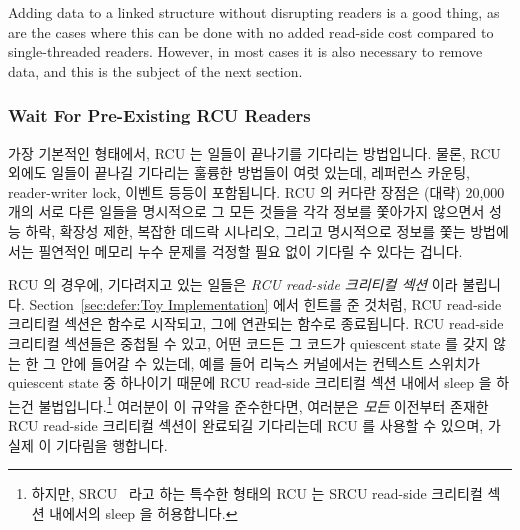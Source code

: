 Adding data to a linked structure without disrupting readers is a good thing,
as are the cases where this can be done with no added read-side cost compared
to single-threaded readers.
However, in most cases it is also necessary to remove data, and this is the
subject of the next section.

\subsubsection{Wait For Pre-Existing RCU Readers}
\label{sec:defer:Wait For Pre-Existing RCU Readers}

가장 기본적인 형태에서, RCU 는 일들이 끝나기를 기다리는 방법입니다.
물론, RCU 외에도 일들이 끝나길 기다리는 훌륭한 방법들이 여럿 있는데, 레퍼런스
카운팅, reader-writer lock, 이벤트 등등이 포함됩니다.
RCU 의 커다란 장점은 (대략) 20,000 개의 서로 다른 일들을 명시적으로 그 모든
것들을 각각 정보를 쫓아가지 않으면서 성능 하락, 확장성 제한, 복잡한 데드락
시나리오, 그리고 명시적으로 정보를 쫓는 방법에서는 필연적인 메모리 누수 문제를
걱정할 필요 없이 기다릴 수 있다는 겁니다.

RCU 의 경우에, 기다려지고 있는 일들은 \emph{RCU read-side 크리티컬 섹션} 이라
불립니다.
Section~\ref{sec:defer:Toy Implementation}
에서 힌트를 준 것처럼, RCU read-side 크리티컬 섹션은 
함수로 시작되고, 그에 연관되는  함수로 종료됩니다.
RCU read-side 크리티컬 섹션들은 중첩될 수 있고, 어떤 코드든 그 코드가
quiescent state 를 갖지 않는 한 그 안에 들어갈 수 있는데, 예를 들어 리눅스
커널에서는 컨텍스트 스위치가 quiescent state 중 하나이기 때문에 RCU read-side
크리티컬 섹션 내에서 sleep 을 하는건 불법입니다.\footnote{
	하지만, SRCU~\cite{PaulEMcKenney2006c} 라고 하는 특수한 형태의 RCU 는
	SRCU read-side 크리티컬 섹션 내에서의 sleep 을 허용합니다.}
여러분이 이 규약을 준수한다면, 여러분은 \emph{모든} 이전부터 존재한 RCU
read-side 크리티컬 섹션이 완료되길 기다리는데 RCU 를 사용할 수 있으며,
 가 실제 이 기다림을 행합니다.

